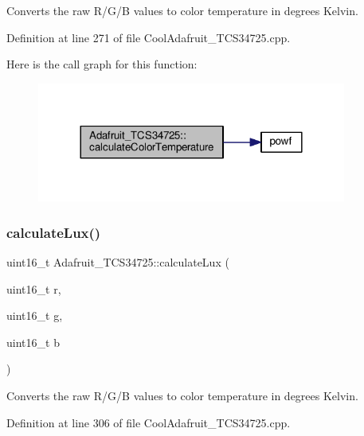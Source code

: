 Converts the raw R/\+G/B values to color temperature in degrees Kelvin. 



Definition at line 271 of file Cool\+Adafruit\+\_\+\+T\+C\+S34725.\+cpp.

Here is the call graph for this function\+:
\nopagebreak
\begin{figure}[H]
\begin{center}
\leavevmode
\includegraphics[width=288pt]{class_adafruit___t_c_s34725_a9c6c7ab8a84a47a65ff04a125bcfee92_cgraph}
\end{center}
\end{figure}
\mbox{\label{class_adafruit___t_c_s34725_a10b9be546ee3bdf04e0380161aad589b}} 
\subsubsection{\texorpdfstring{calculate\+Lux()}{calculateLux()}}
{\footnotesize\ttfamily uint16\+\_\+t Adafruit\+\_\+\+T\+C\+S34725\+::calculate\+Lux (\begin{DoxyParamCaption}\item[{uint16\+\_\+t}]{r,  }\item[{uint16\+\_\+t}]{g,  }\item[{uint16\+\_\+t}]{b }\end{DoxyParamCaption})}



Converts the raw R/\+G/B values to color temperature in degrees Kelvin. 



Definition at line 306 of file Cool\+Adafruit\+\_\+\+T\+C\+S34725.\+cpp.

\mbox{\label{class_adafruit___t_c_s34725_a731a3542039027f75170b667aaf8e3a0}} 
